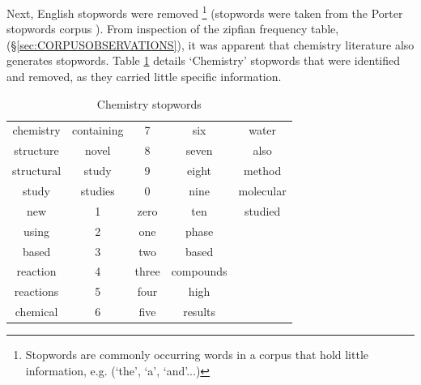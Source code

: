 Next, English stopwords were removed \footnote{Stopwords are commonly occurring words in a corpus that hold little information, e.g. (`the', `a', `and'...)} (stopwords were taken from the Porter stopwords corpus\cite{nltk} \cite{porter}). From inspection of the zipfian frequency table, (\S \ref{sec:CORPUSOBSERVATIONS}), it was apparent that chemistry literature also generates stopwords. Table \ref{tab:CHEMSTOP} details `Chemistry' stopwords that were identified and removed, as they carried little specific information. 
\begin{table}[h!]
\begin{center}
\caption{Chemistry stopwords}
\label{tab:CHEMSTOP}
\begin{tabular}{||c|c|c|c|c||}
\hline
chemistry & containing & 7 & six & water\\
structure & novel & 8 & seven & also\\
structural & study & 9 & eight & method\\
study & studies & 0 & nine & molecular\\
new & 1 & zero & ten & studied\\
using & 2 & one & phase& \\
based & 3 & two & based& \\
reaction & 4 & three & compounds & \\
reactions & 5 & four & high & \\
chemical & 6 & five & results & \\
\hline

\end{tabular}
\end{center}
\end{table}

